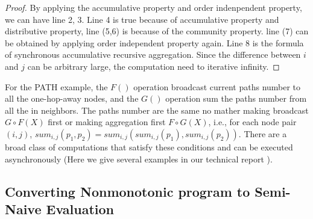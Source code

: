 {\begin{proof}
	By applying the accumulative property and order indenpendent property, we can have line 2, 3. Line 4 is true because of accumulative property
	and distributive property, line (5,6) is because of the community property. line (7) can be obtained by applying order independent property again.
	Line 8 is the formula of synchronous accumulative recursive aggregation. Since the difference between $i$ and $j$ can be arbitrary large, the computation need to iterative infinity.
	\end{proof}

For the PATH example, the $F()$ operation broadcast current paths number to all the one-hop-away nodes, and the $G()$ operation sum the paths number from all the in neighbors. The paths number are the same no mather making broadcast $G\circ F(X)$ first or making aggregation first $F\circ G(X)$, i.e., for each node pair $(i,j)$, $sum_{i,j}(p_1,p_2)= sum_{i,j}(sum_{i,j}(p_1),sum_{i,j}(p_2))$. There are a broad class of computations that satisfy these conditions and can be executed asynchronously (Here we give several examples in our technical report \cite{fullversion}).




\subsection{Converting Nonmonotonic program to Semi-Naive Evaluation}
\label{sec:async:convert}
}
